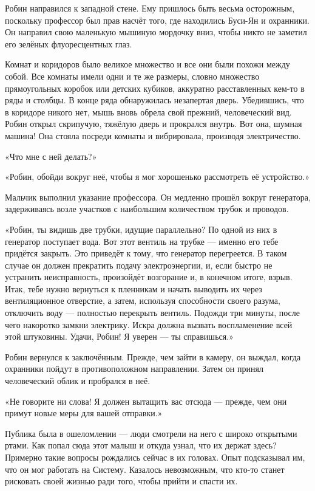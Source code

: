 \documentclass[a4paper,12pt]{book}
\begin{document}
\par
Робин направился к западной стене. Ему пришлось быть весьма осторожным, поскольку профессор был прав насчёт того, где находились Буси-Ян и охранники. Он направил свою маленькую мышиную мордочку вниз, чтобы никто не заметил его зелёных флуоресцентных глаз.
\par
Комнат и коридоров было великое множество и все они были похожи между собой. Все комнаты имели одни и те же размеры, словно множество прямоугольных коробок или детских кубиков, аккуратно расставленных кем-то в ряды и столбцы. В конце ряда обнаружилась незапертая дверь. Убедившись, что в коридоре никого нет, мышь вновь обрела свой прежний, человеческий вид. Робин открыл скрипучую, тяжёлую дверь и прокрался внутрь. Вот она, шумная машина! Она стояла посреди комнаты и вибрировала, производя электричество.
\par
«Что мне с ней делать?»
\par
«Робин, обойди вокруг неё, чтобы я мог хорошенько рассмотреть её устройство.»
\par
Мальчик выполнил указание профессора. Он медленно прошёл вокруг генератора, задерживаясь возле участков с наибольшим количеством трубок и проводов.
\par
«Робин, ты видишь две трубки, идущие параллельно? По одной из них в генератор поступает вода. Вот этот вентиль на трубке — именно его тебе придётся закрыть. Это приведёт к тому, что генератор перегреется. В таком случае он должен прекратить подачу электроэнергии, и, если быстро не устранить неисправность, произойдёт возгорание и, в конечном итоге, взрыв. Итак, тебе нужно вернуться к пленникам и начать выводить их через вентиляционное отверстие, а затем, используя способности своего разума, отключить воду — полностью перекрыть вентиль. Подожди три минуты, после чего накоротко замкни электрику. Искра должна вызвать воспламенение всей этой штуковины. Удачи, Робин! Я уверен — ты справишься.»\\
\par
Робин вернулся к заключённым. Прежде, чем зайти в камеру, он выждал, когда охранники пойдут в противоположном направлении. Затем он принял человеческий облик и пробрался в неё.
\par
«Не говорите ни слова! Я должен вытащить вас отсюда — прежде, чем они примут новые меры для вашей отправки.»
\par
Публика была в ошеломлении — люди смотрели на него с широко открытыми ртами. Как попал сюда этот малыш и откуда узнал, что их держат здесь? Примерно такие вопросы рождались сейчас в их головах. Опыт подсказывал им, что он мог работать на Систему. Казалось невозможным, что кто-то станет рисковать своей жизнью ради того, чтобы прийти и спасти их.
\end{document}
